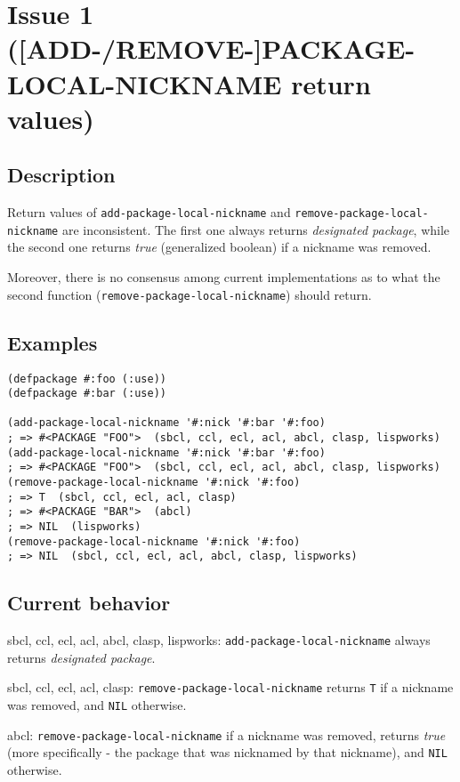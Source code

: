\documentclass[11pt]{article}
\author{Grolter Bell}
\date{\today}
\title{}
\begin{document}
\section{Issue 1 ([ADD-/REMOVE-]PACKAGE-LOCAL-NICKNAME return values)}
\label{sec:org56d5e4c}
\subsection{Description}
\label{sec:org93c6487}
Return values of \texttt{add-package-local-nickname} and \texttt{remove-package-local-nickname}
are inconsistent. The first one always returns \emph{designated package}, while the
second one returns \emph{true} (generalized boolean) if a nickname was removed.

Moreover, there is no consensus among current implementations as to what the second
function (\texttt{remove-package-local-nickname}) should return.
\subsection{Examples}
\label{sec:orgcbf95f7}
\begin{verbatim}
(defpackage #:foo (:use))
(defpackage #:bar (:use))

(add-package-local-nickname '#:nick '#:bar '#:foo)
; => #<PACKAGE "FOO">  (sbcl, ccl, ecl, acl, abcl, clasp, lispworks)
(add-package-local-nickname '#:nick '#:bar '#:foo)
; => #<PACKAGE "FOO">  (sbcl, ccl, ecl, acl, abcl, clasp, lispworks)
(remove-package-local-nickname '#:nick '#:foo)
; => T  (sbcl, ccl, ecl, acl, clasp)
; => #<PACKAGE "BAR">  (abcl)
; => NIL  (lispworks)
(remove-package-local-nickname '#:nick '#:foo)
; => NIL  (sbcl, ccl, ecl, acl, abcl, clasp, lispworks)
\end{verbatim}
\subsection{Current behavior}
\label{sec:orge957f7c}
sbcl, ccl, ecl, acl, abcl, clasp, lispworks:
  \texttt{add-package-local-nickname} always returns \emph{designated package}.

sbcl, ccl, ecl, acl, clasp:
  \texttt{remove-package-local-nickname} returns \texttt{T} if a nickname was removed,
  and \texttt{NIL} otherwise.

abcl:
  \texttt{remove-package-local-nickname} if a nickname was removed, returns \emph{true} (more
  specifically - the package that was nicknamed by that nickname), and \texttt{NIL}
  otherwise.
\end{document}
